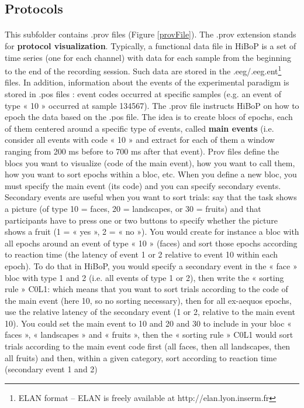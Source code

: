 \documentclass[a4paper]{article}
\begin{document}
\subsection{Protocols}
\paragraph{} This subfolder contains .prov files (Figure \ref{provFile}). The .prov extension stands for \textbf{protocol visualization}. Typically, a functional data file in HiBoP is a set of time series (one for each channel) with data for each sample from the beginning to the end of the recording session. Such data are stored in the .eeg/.eeg.ent\footnote{\label{ELAN}ELAN format – ELAN is freely available at http://elan.lyon.inserm.fr} files.
In addition, information about the events of the experimental paradigm is stored in .pos files : event codes occurred at specific samples (e.g. an event of type « 10 » occurred at sample 134567).
The .prov file instructs HiBoP on how to epoch the data based on the .pos file. The idea is to create blocs of epochs, each of them centered around a specific type of events, called \textbf{main events} (i.e. consider all events with code « 10 » and extract for each of them a window ranging from 200 ms before to 700 ms after that event). Prov files define the blocs you want to visualize (code of the main event), how you want to call them, how you want to sort epochs within a bloc, etc.
When you define a new bloc, you must specify the main event (its code) and you can specify secondary events. Secondary events are useful when you want to sort trials: say that the task shows a picture (of type 10 = faces, 20 = landscapes, or 30 = fruits) and that participants have to press one or two buttons to specify whether the picture shows a fruit (1 = « yes », 2 = « no »). You would create for instance a bloc with all epochs around an event of type « 10 » (faces) and sort those epochs according to reaction time (the latency of event 1 or 2 relative to event 10 within each epoch). To do that in HiBoP, you would specify a secondary event in the « face » bloc with type 1 and 2 (i.e. all events of type 1 or 2), then write the « sorting rule » C0L1: which means that you want to sort trials according to the code of the main event (here 10, so no sorting necessary), then for all ex-aequos epochs, use the relative latency of the secondary event (1 or 2, relative to the main event 10).
You could set the main event to 10 and 20 and 30 to include in your bloc « faces », « landscapes » and « fruits », then the « sorting rule » C0L1 would sort trials according to the main event code first (all faces, then all landscapes, then all fruits) and then, within a given category, sort according to reaction time (secondary event 1 and 2)
\end{document}
